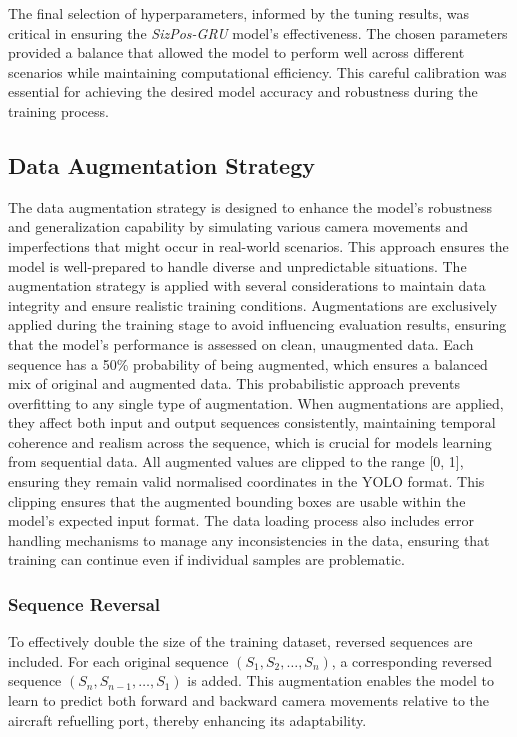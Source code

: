 \documentclass[12pt,oneside]{book} %
\begin{document}
\noindent The final selection of hyperparameters, informed by the tuning results, was
critical in ensuring the \textit{SizPos-GRU} model's effectiveness. The chosen
parameters provided a balance that allowed the model to perform well across
different scenarios while maintaining computational efficiency. This careful
calibration was essential for achieving the desired model accuracy and
robustness during the training process.

\subsection*{Data Augmentation Strategy}
\noindent The data augmentation strategy is designed to enhance the model's robustness
and generalization capability by simulating various camera movements and
imperfections that might occur in real-world scenarios. This approach ensures
the model is well-prepared to handle diverse and unpredictable situations. The augmentation strategy is applied with several considerations to maintain
data integrity and ensure realistic training conditions. Augmentations are
exclusively applied during the training stage to avoid influencing evaluation
results, ensuring that the model's performance is assessed on clean,
unaugmented data. Each sequence has a 50\% probability of being augmented,
which ensures a balanced mix of original and augmented data. This probabilistic
approach prevents overfitting to any single type of augmentation. When
augmentations are applied, they affect both input and output sequences
consistently, maintaining temporal coherence and realism across the sequence,
which is crucial for models learning from sequential data. All augmented values
are clipped to the range [0, 1], ensuring they remain valid normalised
coordinates in the YOLO format. This clipping ensures that the augmented
bounding boxes are usable within the model's expected input format. The data
loading process also includes error handling mechanisms to manage any
inconsistencies in the data, ensuring that training can continue even if
individual samples are problematic.

\subsubsection*{Sequence Reversal}
\noindent To effectively double the size of the training dataset, reversed sequences are
included. For each original sequence $(S_1, S_2, \ldots, S_n)$, a corresponding
reversed sequence $(S_n, S_{n-1}, \ldots, S_1)$ is added. This augmentation
enables the model to learn to predict both forward and backward camera
movements relative to the aircraft refuelling port, thereby enhancing its
adaptability.
\end{document}
